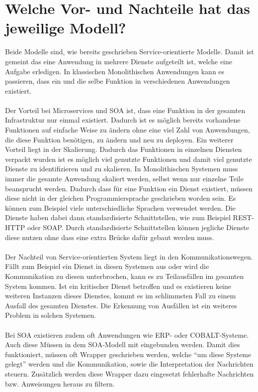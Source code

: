 \section{Welche Vor- und Nachteile hat das jeweilige Modell?}
\label{sec:VorNachteile}
Beide Modelle sind, wie bereits geschrieben Service-orientierte Modelle. Damit ist gemeint das eine Anwendung in mehrere Dienste aufgeteilt ist, welche eine Aufgabe erledigen. In klassischen Monolithischen Anwendungen kann es passieren, dass ein und die selbe Funktion in verschiedenen Anwendungen existiert.
\\\\
Der Vorteil bei Microservices und SOA ist, dass eine Funktion in der gesamten Infrastruktur nur einmal existiert. Dadurch ist es möglich bereits vorhandene Funktionen auf einfache Weise zu ändern ohne eine viel Zahl von Anwendungen, die diese Funktion benötigen, zu ändern und neu zu deployen.
Ein weiterer Vorteil liegt in der Skalierung. Dadurch das Funktionen in einzelnen Diensten verpackt wurden ist es möglich viel genutzte Funktionen und damit viel genutzte Dienste zu identifizieren und zu skalieren. In Monolithischen Systemen muss immer die gesamte Anwendung skaliert werden, selbst wenn nur einzelne Teile beansprucht werden.
Dadurch dass für eine Funktion ein Dienst existiert, müssen diese nicht in der gleichen Programmiersprache geschrieben worden sein. Es können zum Beispiel viele unterschiedliche Sprachen verwendet werden. Die Dienste haben dabei dann standardisierte Schnittstellen, wie zum Beispiel REST-HTTP oder SOAP. Durch standardisierte Schnittstellen können jegliche Dienste diese nutzen ohne dass eine extra Brücke dafür gebaut werden muss.
\\\\
Der Nachteil von Service-orientierten System liegt in den Kommunikationswegen. Fällt zum Beispiel ein Dienst in diesen Systemen aus oder wird die Kommunikation zu diesen unterbrochen, kann es zu Teilausfällen im gesamten System kommen. Ist ein kritischer Dienst betroffen und es existieren keine weiteren Instanzen dieses Dienstes, kommt es im schlimmsten Fall zu einem Ausfall des gesamten Dienstes. Die Erkennung von Ausfällen ist ein weiteres Problem in solchen Systemen.
\\\\
Bei SOA existieren zudem oft Anwendungen wie ERP- oder COBALT-Systeme. Auch diese Müssen in dem SOA-Modell mit eingebunden werden. Damit dies funktioniert, müssen oft Wrapper geschrieben werden, welche "`um diese Systeme gelegt"' werden und die Kommunikation, sowie die Interpretation der Nachrichten steuern. Zusätzlich werden diese Wrapper dazu eingesetzt fehlerhafte Nachrichten bzw. Anweisungen heraus zu filtern.

